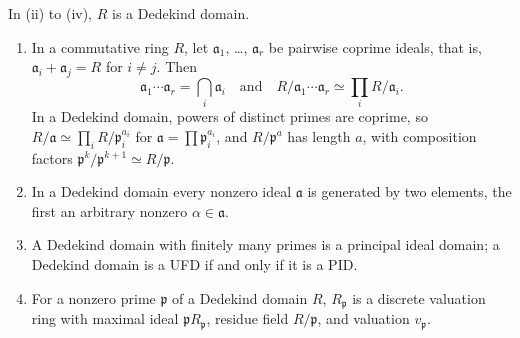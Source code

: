 \begin{proposition}\label{prop:ant:crt}
In (ii) to (iv), $R$ is a Dedekind domain.
\begin{enumerate}[label=(\roman*)]
\item In a commutative ring $R$, let $\mathfrak a_1$, \dots, $\mathfrak a_r$ be pairwise coprime ideals, that is,
$\mathfrak a_i+\mathfrak a_j=R$ for $i\ne j$. Then
\[
\mathfrak a_1\cdots\mathfrak a_r=\bigcap_i\mathfrak a_i\quad\text{and}\quad R/\mathfrak a_1\cdots\mathfrak a_r\simeq\prod_iR/\mathfrak a_i.
\] In a Dedekind domain, powers of
distinct primes are coprime, so $R/\mathfrak a\simeq\prod_iR/\mathfrak p_i^{a_i}$ for $\mathfrak a=\prod\mathfrak p_i^{a_i}$, and $R/\mathfrak p^a$ has length
$a$, with composition factors $\mathfrak p^k/\mathfrak p^{k+1}\simeq R/\mathfrak p$.
\item In a Dedekind domain every nonzero ideal $\mathfrak a$ is generated by two elements, the first an arbitrary nonzero $\alpha\in\mathfrak a$.
\item A Dedekind domain with finitely many primes is a principal ideal domain; a Dedekind domain is a UFD if and only if it is a PID.
\item For a nonzero prime $\mathfrak p$ of a Dedekind domain $R$, $R_{\mathfrak p}$ is a discrete valuation ring with maximal ideal
$\mathfrak pR_{\mathfrak p}$, residue field $R/\mathfrak p$, and valuation $v_{\mathfrak p}$.
\end{enumerate}
\end{proposition}


